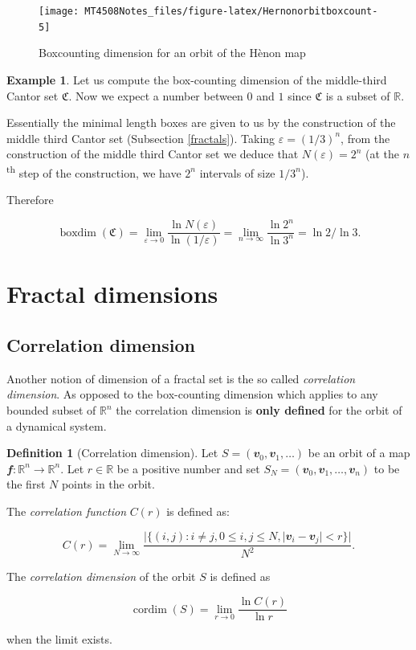 \documentclass[
  a4paper,
  oneside,
  final]{krantz}
\newcommand{\R}{\mathbb{R}}
\renewcommand{\epsilon}{\varepsilon}
\renewcommand{\v}[1]{{\mathbfit{#1}}}
\newcommand{\CC}{\mathfrak{C}}
\newcommand{\bdim}{\mathop{\mathrm{boxdim}}}
\newcommand{\cdim}{\mathop{\mathrm{cordim}}}
\theoremstyle{definition}
\newtheorem{definition}{Definition}[chapter]
\theoremstyle{definition}
\newtheorem{example}{Example}[chapter]
\theoremstyle{definition}
\theoremstyle{definition}
\theoremstyle{remark}
\begin{document}
\begin{figure}

{\centering \texttt{[image: MT4508Notes\_files/figure-latex/Hernonorbitboxcount-5]} 

}

\caption{Boxcounting dimension for an orbit of the Hènon map}\label{fig:Hernonorbitboxcount}
\end{figure}

\begin{example}
\protect\hypertarget{exm:boxdimCantor}{}\label{exm:boxdimCantor}Let us compute the box-counting dimension of the middle-third Cantor set \(\CC\). Now we expect a number between \(0\) and \(1\) since \(\CC\) is a subset of \(\R\).

Essentially the minimal length boxes are given to us by the construction of the middle third Cantor set (Subsection \ref{fractals}). Taking \(\epsilon = (1/3)^{n}\), from the construction of the middle third Cantor set we deduce that \(N(\epsilon) = 2^n\) (at the \(n\)\textsuperscript{th} step of the construction, we have \(2^n\) intervals of size \(1/3^{n}\)).

Therefore

\[\bdim(\CC) = \lim_{\epsilon\to 0} \dfrac{\ln N(\epsilon)}{\ln(1/\epsilon)}  = \lim_{n \to \infty} \dfrac{\ln2^{n}}{\ln 3^n} = \ln 2/\ln 3.\]
\end{example}

\hypertarget{fractaldimcont}{%
\section{Fractal dimensions}\label{fractaldimcont}}

\hypertarget{correlationdim}{%
\subsection{Correlation dimension}\label{correlationdim}}

Another notion of dimension of a fractal set is the so called \emph{correlation dimension}. As opposed to the box-counting dimension which applies to any bounded subset of \(\R^{n}\) the correlation dimension is \textbf{only defined} for the orbit of a dynamical system.

\begin{definition}[Correlation dimension]
\protect\hypertarget{def:correlationdimension}{}\label{def:correlationdimension}Let \(S= (\v{v}_{0}, \v{v}_{1}, \ldots )\) be an orbit of a map \(\v{f}: \R^{n} \to \R^{n}\). Let \(r \in \R\) be a positive number and set \(S_{N} = (\v{v}_{0}, \v{v}_{1}, \ldots, \v{v}_{n})\) to be the first \(N\) points in the orbit.

The \emph{correlation function} \(C(r)\) is defined as:

\[ C(r) = \lim_{N \to \infty} \dfrac{|\{ (i,j) : i \ne j, 0 \le i,j \le N, |\v{v}_i - \v{v}_{j}| <r    \} |}{N^2}. \]

The \emph{correlation dimension} of the orbit \(S\) is defined as

\[ \cdim(S) = \lim_{r \to 0} \dfrac{\ln C(r)}{\ln r} \]

when the limit exists.
\end{definition}
\end{document}
